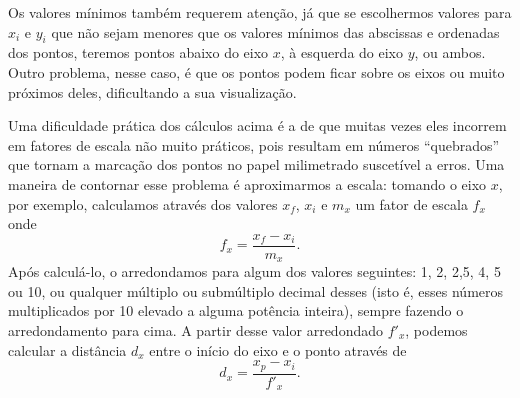 Os valores mínimos também requerem atenção, já que se escolhermos valores para $x_i$ e $y_i$ que não sejam menores que os valores mínimos das abscissas e ordenadas dos pontos, teremos pontos abaixo do eixo $x$, à esquerda do eixo $y$, ou ambos. Outro problema, nesse caso, é que os pontos podem ficar sobre os eixos ou muito próximos deles, dificultando a sua visualização.

Uma dificuldade prática dos cálculos acima é a de que muitas vezes eles incorrem em fatores de escala não muito práticos, pois resultam em números ``quebrados'' que tornam a marcação dos pontos no papel milimetrado suscetível a erros. Uma maneira de contornar esse problema é aproximarmos a escala: tomando o eixo $x$, por exemplo, calculamos através dos valores $x_f$, $x_i$ e $m_x$ um fator de escala $f_x$ onde
		\begin{equation}
			f_x = \frac{x_f - x_i}{m_x}.
		\end{equation}
Após calculá-lo, o arredondamos para algum dos valores seguintes: 1, 2, 2,5, 4, 5 ou 10, ou qualquer múltiplo ou submúltiplo decimal desses (isto é, esses números multiplicados por 10 elevado a alguma potência inteira), sempre fazendo o arredondamento para cima. A partir desse valor arredondado $f'_x$, podemos calcular a distância $d_x$ entre o início do eixo e o ponto através de
		\begin{equation}
			d_x = \frac{x_p - x_i}{f'_x}.
		\end{equation}

